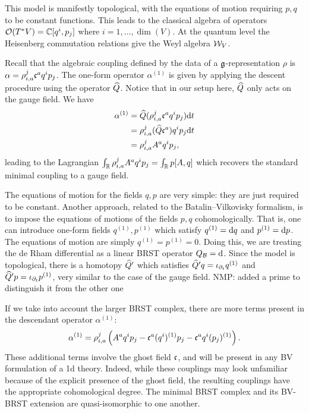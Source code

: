 \documentclass[11pt]{amsart}
\def\natalie#1{{\textcolor{green!65!black}{NMP: {#1}}}}
\begin{document}
This model is manifestly topological, with the equations of motion requiring $p,q$ to be constant functions.
This leads to the classical algebra of operators $\cO(T^* V) = \CC[q^i, p_j]$ where $i=1,\ldots, \dim (V)$. 
At the quantum level the Heisenberg commutation relations give the Weyl algebra $\cW_V$. 
 
Recall that the algebraic coupling defined by the data of a $\fg$-representation $\rho$ is $\alpha = \rho_{i,a}^j \fc^a q^i p_j$.
The one-form operator $\alpha^{(1)}$ is given by applying the descent procedure using the operator $\Hat{Q}$. 
Notice that in our setup here, $\Hat{Q}$ only acts on the gauge field.
We have
\begin{align*}
\alpha^{(1)} & = \Hat{Q} (\rho_{i,a}^j \fc^a q^i p_j) \d t  \\
& = \rho_{i,a}^j (\Hat{Q} \fc^a) q^i p_j \d t \\
& = \rho_{i,a}^j A^a q^i p_j ,
\end{align*}
leading to the Lagrangian $\int_{\RR} \rho_{i,a}^j A^a q^i p_j = \int_\RR p [A,q]$ which recovers the standard minimal coupling to a gauge field. 

The equations of motion for the fields $q,p$ are very simple: they are just required to be constant. 
Another approach, related to the Batalin--Vilkovisky formalism, is to impose the equations of motions of the fields $p,q$ cohomologically. 
That is, one can introduce one-form fields $q^{(1)}, p^{(1)}$ which satisfy $q^{(1)} = \d q$ and $p^{(1)} = \d p$. 
The equations of motion are simply $q^{(1)} = p^{(1)} = 0$. 
Doing this, we are treating the de Rham differential as a linear BRST operator $Q_{\cB} = \d$. 
Since the model is topological, there is a homotopy $\Hat{Q}'$ which satisfies $\Hat{Q}' q = \iota_{\partial_t} q^{(1)}$ and $\Hat{Q}' p = \iota_{\partial_t} p^{(1)}$, very similar to the case of the gauge field. \natalie{added a prime to distinguish it from the other one}

If we take into account the larger BRST complex, there are more terms present in the descendant operator $\alpha^{(1)}$:
\[
\alpha^{(1)} = \rho_{i,a}^j \left(A^a q^i p_j - \fc^a (q^i)^{(1)} p_j - \fc^a q^i (p_j)^{(1)}\right) . 
\] 
These additional terms involve the ghost field $\fc$, and will be present in any BV formulation of a 1d theory.  Indeed, while these couplings may look unfamiliar because of the explicit presence of the ghost field, the resulting couplings have the appropriate cohomological degree. The minimal BRST complex and its BV-BRST extension are quasi-isomorphic to one another. 
\end{document}
